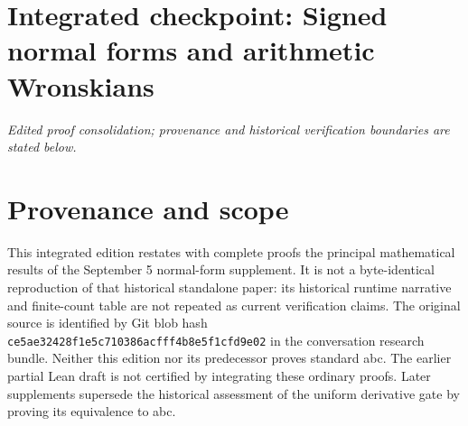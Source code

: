 \clearpage
\begingroup
\let\Z\relax
\newcommand{\Z}{\mathbb Z}
\let\N\relax
\newcommand{\N}{\mathbb N}
\let\rad\relax
\newcommand{\rad}{\operatorname{rad}}
\let\lcm\relax
\newcommand{\lcm}{\operatorname{lcm}}
\section*{Integrated checkpoint: Signed normal forms and arithmetic Wronskians}
\label{checkpoint:normal}
\noindent\textit{Edited proof consolidation; provenance and historical verification boundaries are stated below.}\medskip

\section{Provenance and scope}
This integrated edition restates with complete proofs the principal mathematical results of the September 5 normal-form supplement. It is not a byte-identical reproduction of that historical standalone paper: its historical runtime narrative and finite-count table are not repeated as current verification claims. The original source is identified by Git blob hash \texttt{ce5ae32428f1e5c710386acfff4b8e5f1cfd9e02} in the conversation research bundle. Neither this edition nor its predecessor proves standard abc. The earlier partial Lean draft is not certified by integrating these ordinary proofs. Later supplements supersede the historical assessment of the uniform derivative gate by proving its equivalence to abc.

